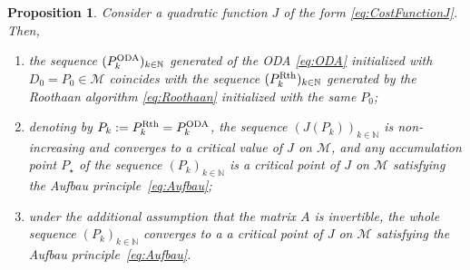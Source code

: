 \documentclass{article}
\def\N{\mathbb N}
\newtheorem{proposition}[theorem]{Proposition}
\newcommand{\1}{{\mathds 1}}
\begin{document}
\begin{proposition} \label{prop:SCF} Consider a quadratic function $J$ of the form \eqref{eq:CostFunctionJ}. Then, 
\begin{enumerate}
\item the sequence $(P_k^{\rm ODA})_{k \in \N}$ generated of the ODA \eqref{eq:ODA} initialized with $D_0=P_0 \in \mathcal M$ coincides with the sequence $(P_k^{\rm Rth})_{k \in \N}$ generated by the Roothaan algorithm \eqref{eq:Roothaan} initialized with the same $P_0$;
\item denoting by $P_k:=P_k^{\rm Rth}=P_k^{\rm ODA}$, the sequence $(J(P_k))_{k \in \N}$ is non-increasing and converges to a critical value of $J$ on $\mathcal M$, and any accumulation point $P_\star$ of the sequence $(P_k)_{k \in \N}$ is a critical point of $J$ on $\mathcal M$ satisfying the Aufbau principle~\eqref{eq:Aufbau};
\item under the additional assumption that the matrix $A$ is invertible, the whole sequence $(P_k)_{k \in \N}$ converges to a a critical point of $J$ on $\mathcal M$ satisfying the Aufbau principle~\eqref{eq:Aufbau}.
\end{enumerate}
\end{proposition}
\end{document}
